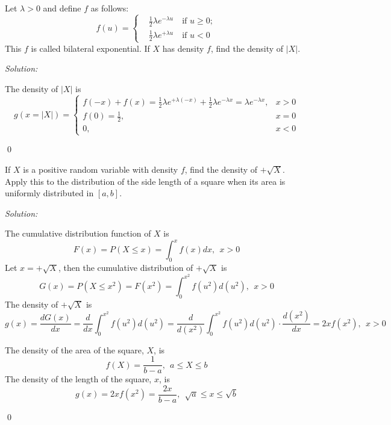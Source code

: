 \documentclass[12pt]{article}
\newenvironment{problem}[2][Problem]{\begin{trivlist}
\item[\hskip \labelsep {\bfseries #1}\hskip \labelsep {\bfseries #2.}]}{\end{trivlist}}
\newenvironment{sol}
    {\emph{Solution:}
    }
    {
    \qed
    }
\begin{document}




\begin{problem}{1} 
Let $\lambda>0$ and define $f$ as follows:
\begin{equation}
    f(u)=\begin{cases}
    &\frac{1}{2}\lambda e^{-\lambda u} \quad \text{if } u\geq 0;\\
    &\frac{1}{2}\lambda e^{+\lambda u} \quad \text{if } u<0
    \end{cases}
\end{equation}
This $f$ is called bilateral exponential. If $X$ has density $f$, find the density of $|X|$.
\end{problem}
\begin{sol}
The density of $|X|$ is
\[
g(x=|X|)=
\left\{\begin{array}{ll}
f(-x)+f(x)=\frac{1}{2}\lambda e^{+\lambda(-x)}+\frac{1}{2}\lambda e^{-\lambda x}=\lambda e^{-\lambda x},&x>0\\
f(0)=\frac{1}{2},&x=0\\
0,&x<0
\end{array}\right.
\]
\end{sol}



\begin{problem}{2}
If $X$ is a positive random variable with density $f$, find the density of $+\sqrt{X}$. Apply this to the distribution of the side length of a square when its area is uniformly distributed in $[a,b]$.
\end{problem}
\begin{sol}
The cumulative distribution function of $X$ is
\[
F(x)=P(X\leq x)=\int_0^xf(x)dx,~~x>0
\]
Let $x=+\sqrt{X}$, then the cumulative distribution of $+\sqrt{X}$ is
\[
G(x)=P(X\leq x^2)=F(x^2)=\int_0^{x^2}f(u^2)d(u^2),~~x>0
\]
The density of $+\sqrt{X}$ is
\[
g(x)=\frac{dG(x)}{dx}=\frac{d}{dx}\int_0^{x^2}f(u^2)d(u^2)=\frac{d}{d(x^2)}\int_0^{x^2}f(u^2)d(u^2)\cdot\frac{d(x^2)}{dx}=2xf(x^2),~~x>0
\]

The density of the area of the square, $X$, is
\[
f(X)=\frac{1}{b-a},~~a\leq X\leq b
\]
The density of the length of the square, $x$, is
\[
g(x)=2xf(x^2)=\frac{2x}{b-a},~~\sqrt{a}\leq x\leq\sqrt{b}
\]
\end{sol}
\end{document}
